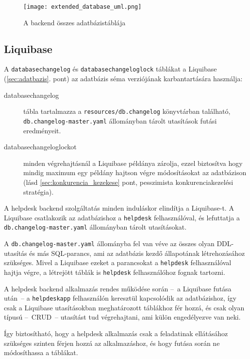 \begin{figure}[hbt] 
	\centering
	\texttt{[image: extended\_database\_uml.png]}
	\caption{A backend összes adatbázistáblája}
	\label{fig:extended_database_uml}
\end{figure}


\subsection{Liquibase}\label{sec:liquibase}
A \texttt{databasechangelog} és \texttt{databasechangeloglock} táblákat a Liquibase (\ref{sec:adatbazis}. pont) az adatbázis séma verziójának karbantartására használja:
\begin{description}
	\item[databasechangelog] tábla tartalmazza a \mbox{\texttt{resources/db.changelog}} könyvtárban található,  \mbox{\texttt{db.changelog-master.yaml}} állományban tárolt utasítások futási eredményeit.
	
	\item[databasechangeloglockot] minden végrehajtásnál a Liquibase példánya  zárolja, ezzel biztosítva hogy mindig maximum egy példány hajtson végre módosításokat az adatbázison (lásd \ref{sec:konkurencia_kezekese} pont, pesszimista konkurenciakezelési stratégia).
\end{description}

A helpdesk backend szolgáltatás minden induláskor elindítja a Liquibase-t. A Liquibase csatlakozik az adatbázishoz a \texttt{helpdesk} felhasználóval, és lefuttatja a \mbox{\texttt{db.changelog-master.yaml}} állományban tárolt utasításokat.

A \mbox{\texttt{db.changelog-master.yaml}} állományba fel van véve az összes olyan DDL-utasítás és más SQL-parancs, ami az adatbázis kezdő állapotának létrehozásához szükséges. Mivel a Liquibase ezeket a parancsokat a \texttt{helpdesk} felhasználóval hajtja végre, a létrejött táblák is \texttt{helpdesk} felhasználóhoz fognak tartozni. 

A helpdesk backend alkalmazás rendes működése során --~a Liquibase futása után~--   a \texttt{helpdesk\textunderscore app} felhasználón keresztül kapcsolódik az adatbázishoz, így csak a Liquibase utasításokban meghatározott táblákhoz fér hozzá, és csak olyan típusú --~CRUD~--   utasítást tud végrehajtani, ami külön engedélyezve van neki.

Így biztosítható, hogy a helpdesk alkalmazás csak a feladatinak ellátásához szükséges szinten férjen hozzá az alkalmazáshoz, és hogy futása során ne módosíthassa a táblákat. 


